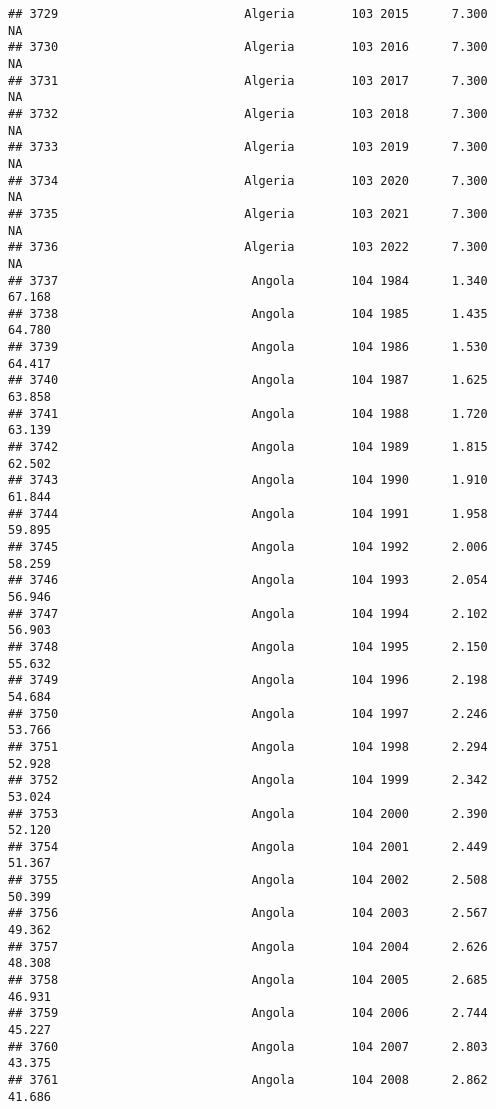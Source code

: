 \documentclass[
]{article}
\begin{document}
\begin{verbatim}
## 3729                          Algeria        103 2015      7.300         NA
## 3730                          Algeria        103 2016      7.300         NA
## 3731                          Algeria        103 2017      7.300         NA
## 3732                          Algeria        103 2018      7.300         NA
## 3733                          Algeria        103 2019      7.300         NA
## 3734                          Algeria        103 2020      7.300         NA
## 3735                          Algeria        103 2021      7.300         NA
## 3736                          Algeria        103 2022      7.300         NA
## 3737                           Angola        104 1984      1.340     67.168
## 3738                           Angola        104 1985      1.435     64.780
## 3739                           Angola        104 1986      1.530     64.417
## 3740                           Angola        104 1987      1.625     63.858
## 3741                           Angola        104 1988      1.720     63.139
## 3742                           Angola        104 1989      1.815     62.502
## 3743                           Angola        104 1990      1.910     61.844
## 3744                           Angola        104 1991      1.958     59.895
## 3745                           Angola        104 1992      2.006     58.259
## 3746                           Angola        104 1993      2.054     56.946
## 3747                           Angola        104 1994      2.102     56.903
## 3748                           Angola        104 1995      2.150     55.632
## 3749                           Angola        104 1996      2.198     54.684
## 3750                           Angola        104 1997      2.246     53.766
## 3751                           Angola        104 1998      2.294     52.928
## 3752                           Angola        104 1999      2.342     53.024
## 3753                           Angola        104 2000      2.390     52.120
## 3754                           Angola        104 2001      2.449     51.367
## 3755                           Angola        104 2002      2.508     50.399
## 3756                           Angola        104 2003      2.567     49.362
## 3757                           Angola        104 2004      2.626     48.308
## 3758                           Angola        104 2005      2.685     46.931
## 3759                           Angola        104 2006      2.744     45.227
## 3760                           Angola        104 2007      2.803     43.375
## 3761                           Angola        104 2008      2.862     41.686

\end{verbatim}
\end{document}
